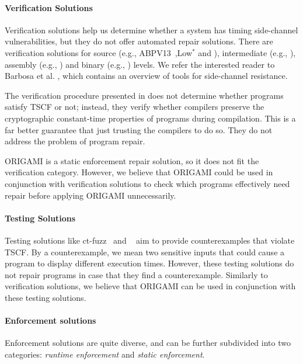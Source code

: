 \paragraph*{Verification Solutions}
Verification solutions help us determine whether a system has timing side-channel vulnerabilities, but they do not offer automated repair solutions. There are verification solutions for source (e.g., ABPV13~\cite{ABPV13},Low$^*$\cite{LowStar} and \cite{7958606}), intermediate  (e.g., \cite{usenix_ctp_verification,FlowTracker}), assembly (e.g., \cite{Jasmin, Vale}) and binary (e.g., \cite{CacheAudit,KMO12}) levels. We refer the interested reader to Barbosa et al. \cite[\S IV]{timing-channel-survey}, which contains an overview of tools for side-channel resistance. 

The verification procedure presented in \cite{SecureCompilation} does not determine whether programs satisfy TSCF or not; instead, they verify whether compilers preserve the cryptographic constant-time properties of programs during compilation. This is a far better guarantee that just trusting the compilers to do so. They do not address the problem of program repair.

ORIGAMI is a static enforcement repair solution, so it does not fit the verification category. However, we believe that ORIGAMI could be used in conjunction with verification solutions to check which programs effectively need repair before applying ORIGAMI unnecessarily. 

\paragraph*{Testing Solutions}
Testing solutions like ct-fuzz~\cite{ct-fuzz} and ~\cite{stvr.1718} aim to provide counterexamples that violate TSCF. By a counterexample, we mean two sensitive inputs that could cause a program to display different execution times. However, these testing solutions do not repair programs in case that they find a counterexample. Similarly to verification solutions, we believe that ORIGAMI can be used in conjunction with these testing solutions.%

\paragraph*{Enforcement solutions}
Enforcement solutions are quite diverse, and can be further subdivided into two categories: \emph{runtime enforcement}  and \emph{static enforcement}. 

